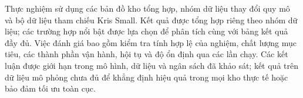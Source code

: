 Thực nghiệm sử dụng các bản đồ kho tổng hợp, nhóm dữ liệu thay đổi quy mô và bộ dữ liệu tham chiếu Kris Small. Kết quả được tổng hợp riêng theo nhóm dữ liệu; các trường hợp nổi bật được lựa chọn để phân tích cùng với bảng kết quả đầy đủ. Việc đánh giá bao gồm kiểm tra tính hợp lệ của nghiệm, chất lượng mục tiêu, các thành phần vận hành, hội tụ và độ ổn định qua các lần chạy. Các kết luận được giới hạn trong mô hình, dữ liệu và ngân sách đã khảo sát; kết quả trên dữ liệu mô phỏng chưa đủ để khẳng định hiệu quả trong mọi kho thực tế hoặc bảo đảm tối ưu toàn cục.
